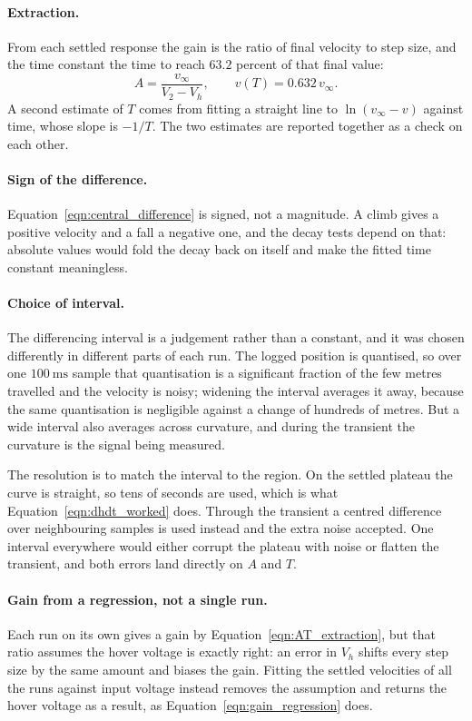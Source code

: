 \paragraph{Extraction.} From each settled response the gain is the ratio of final velocity to step
size, and the time constant the time to reach $63.2$ percent of that final value:
\begin{equation}\label{eqn:AT_extraction}
    A = \frac{v_\infty}{V_2 - V_h},
    \qquad
    v(T) = 0.632\,v_\infty .
\end{equation}
A second estimate of $T$ comes from fitting a straight line to $\ln(v_\infty - v)$ against time,
whose slope is $-1/T$. The two estimates are reported together as a check on each other.

\paragraph{Sign of the difference.} Equation~\eqref{eqn:central_difference} is signed, not a
magnitude. A climb gives a positive velocity and a fall a negative one, and the decay tests depend
on that: absolute values would fold the decay back on itself and make the fitted time constant
meaningless.

\paragraph{Choice of interval.} The differencing interval is a judgement rather than a constant,
and it was chosen differently in different parts of each run. The logged position is quantised, so
over one $100\ \mathrm{ms}$ sample that quantisation is a significant fraction of the few metres
travelled and the velocity is noisy; widening the interval averages it away, because the same
quantisation is negligible against a change of hundreds of metres. But a wide interval also
averages across curvature, and during the transient the curvature is the signal being measured.

The resolution is to match the interval to the region. On the settled plateau the curve is
straight, so tens of seconds are used, which is what Equation~\eqref{eqn:dhdt_worked} does.
Through the transient a centred difference over neighbouring samples is used instead and the extra
noise accepted. One interval everywhere would either corrupt the plateau with noise or flatten
the transient, and both errors land directly on $A$ and $T$.

\paragraph{Gain from a regression, not a single run.} Each run on its own gives a gain by
Equation~\eqref{eqn:AT_extraction}, but that ratio assumes the hover voltage is exactly right: an
error in $V_h$ shifts every step size by the same amount and biases the gain. Fitting the settled
velocities of all the runs against input voltage instead removes the assumption and returns the
hover voltage as a result, as Equation~\eqref{eqn:gain_regression} does.

